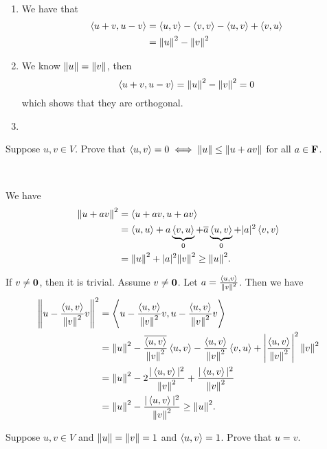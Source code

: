 \begin{solution} \
\begin{enumerate}[label=(\roman*)]
\item We have that
\begin{align*}
\left\langle u+v,u-v\right\rangle
&=\left\langle u,v\right\rangle-\left\langle v,v\right\rangle-\left\langle u,v\right\rangle+\left\langle v,u\right\rangle\\
&=\norm{u}^2-\norm{v}^2
\end{align*}
\item We know $\norm{u}=\norm{v}$, then
\[\left\langle u+v,u-v\right\rangle=\norm{u}^2-\norm{v}^2=0\]
which shows that they are orthogonal.
\item 
\end{enumerate}
\end{solution}

\begin{exercise}
Suppose $u,v\in V$. Prove that $\left\langle u,v\right\rangle=0\iff\norm{u}\le\norm{u+av}$ for all $a\in\mathbf F$.
\end{exercise}

\begin{solution} \

\fbox{$\implies$} We have
\begin{align*}
\norm{u+av}^2
&=\left\langle u+av,u+av\right\rangle\\
&=\left\langle u,u\right\rangle+a\underbrace{\left\langle v,u\right\rangle}_{0}+\overline{a}\underbrace{\left\langle u,v\right\rangle}_{0}+|a|^2\left\langle v,v\right\rangle\\
&=\norm{u}^2+|a|^2\norm{v}^2\ge\norm{u}^2.
\end{align*}

\fbox{$\impliedby$} If $v\neq\vb{0}$, then it is trivial. Assume $v\neq\vb{0}$. Let $a=\frac{\left\langle u,v\right\rangle}{\norm{v}^2}$. Then we have
\begin{align*}
\norm{u-\frac{\left\langle u,v\right\rangle}{\norm{v}^2}v}^2
&=\left\langle u-\frac{\left\langle u,v\right\rangle}{\norm{v}^2}v,u-\frac{\left\langle u,v\right\rangle}{\norm{v}^2}v\right\rangle\\
&=\norm{u}^2-\frac{\overline{\left\langle u,v\right\rangle}}{\norm{v}^2}\left\langle u,v\right\rangle-\frac{\left\langle u,v\right\rangle}{\norm{v}^2}\left\langle v,u\right\rangle+\left|\frac{\left\langle u,v\right\rangle}{\norm{v}^2}\right|^2\norm{v}^2\\
&=\norm{u}^2-2\frac{|\left\langle u,v\right\rangle|^2}{\norm{v}^2}+\frac{|\left\langle u,v\right\rangle|^2}{\norm{v}^2}\\
&=\norm{u}^2-\frac{|\left\langle u,v\right\rangle|^2}{\norm{v}^2}\ge\norm{u}^2.
\end{align*}
\end{solution}

\begin{exercise}
Suppose $u,v\in V$ and $\norm{u}=\norm{v}=1$ and $\left\langle u,v\right\rangle=1$. Prove that $u=v$.
\end{exercise}

